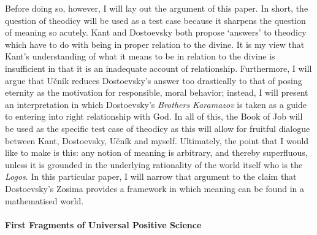 \documentclass[12pt]{article}
\begin{document}
Before doing so, however, I will lay out the argument of this paper. In short, the question of theodicy will be used as a test case because it sharpens the question of meaning so acutely. Kant and Dostoevsky both propose `answers' to theodicy which have to do with being in proper relation to the divine. It is my view that Kant's understanding of what it means to be in relation to the divine is insufficient in that it is an inadequate account of relationship. Furthermore, I will argue that U\v{c}n\'{i}k reduces Dostoevsky's answer too drastically to that of posing eternity as the motivation for responsible, moral behavior; instead, I will present an interpretation in which Dostoevsky's \emph{Brothers Karamazov} is taken as a guide to entering into right relationship with God. In all of this, the Book of Job will be used as the specific test case of theodicy as this will allow for fruitful dialogue between Kant, Dostoevsky, U\v{c}n\'{i}k and myself. Ultimately, the point that I would like to make is this: any notion of meaning is arbitrary, and thereby superfluous, unless it is grounded in the underlying rationality of the world itself who is the \emph{Logos}. In this particular paper, I will narrow that argument to the claim that Dostoevsky's Zosima provides a framework in which meaning can be found in a mathematised world.

\paragraph*{First Fragments of Universal Positive Science}
\end{document}

